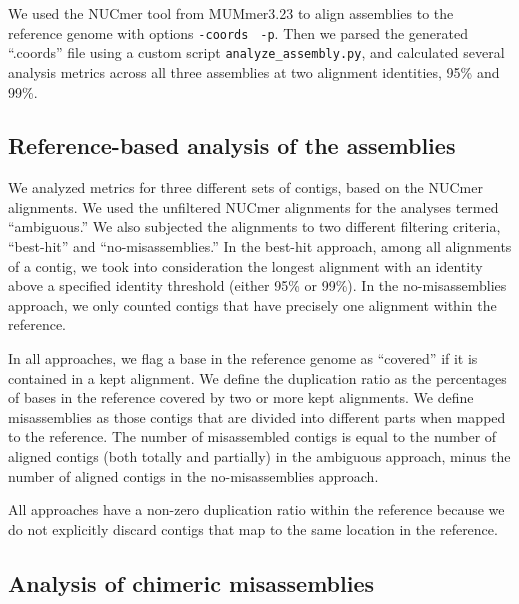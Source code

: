 \documentclass[10pt,a4paper,twocolumn]{article}
\begin{document}
We used the NUCmer tool from MUMmer3.23 \cite{mummer3.0} to align
assemblies to the reference genome with options {\tt \--coords} {\tt
  -p}. Then we parsed the generated ``.coords'' file using a custom
script {\tt{analyze\_assembly.py}}, and calculated several analysis
metrics across all three assemblies at two alignment identities, 95\% and 99\%.

\subsection*{Reference-based analysis of the assemblies}

We analyzed metrics for three different sets of contigs, based on the
NUCmer alignments.  We used the unfiltered NUCmer alignments for the
analyses termed ``ambiguous.''  We also subjected the alignments to
two different filtering criteria, ``best-hit'' and
``no-misassemblies.''
In the best-hit approach, among all alignments of a contig, we took
into consideration the longest alignment with an identity above a specified
identity threshold (either 95\% or 99\%).
In the no-misassemblies approach, we only counted contigs that have
precisely one alignment within the reference.

In all approaches, we flag a base in the reference genome as
``covered'' if it is contained in a kept alignment.  We define the
duplication ratio as the percentages of bases in the reference covered
by two or more kept alignments. We define misassemblies as
those contigs that are divided into different parts when mapped to the
reference.  The number of misassembled contigs is equal to the number
of aligned contigs (both totally and partially) in the ambiguous
approach, minus the number of aligned contigs in the no-misassemblies
approach.


All approaches have a non-zero duplication ratio within the reference
because we do not explicitly discard contigs that map to the same
location in the reference.

\subsection*{Analysis of chimeric misassemblies}
\end{document}
